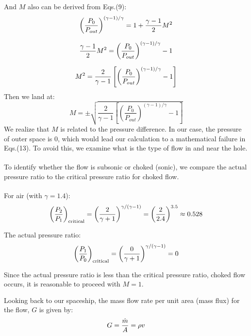 And $M$ also can be derived from Eqs.(9):
\begin{equation}
\left( \frac{P_0}{P_{out}} \right)^{(\gamma - 1)/\gamma} = 1 + \frac{\gamma - 1}{2} M^2\notag
\end{equation}

\begin{equation}
\frac{\gamma - 1}{2} M^2= \left( \frac{P_0}{P_{out}} \right)^{(\gamma - 1)/\gamma} - 1 \notag
\end{equation}

\begin{equation}
M^2 = \frac{2}{\gamma - 1} \left[ \left( \frac{P_0}{P_{out}} \right)^{(\gamma - 1)/\gamma} - 1 \right]\notag
\end{equation}
Then we land at:
\begin{equation}
    M=\pm \sqrt{\frac{2}{\gamma - 1} \left[ \left( \frac{P_0}{P_{out}} \right)^{(\gamma - 1)/\gamma} - 1 \right]}
\end{equation}
We realize that $M$ is related to the pressure difference. In our case, the pressure of outer space is 0, which would lead our calculation to a mathematical failure in Eqs.(13). To avoid this, we examine what is the type of flow in and near the hole. \\\\
To identify whether the flow is subsonic or choked (sonic), we compare the actual pressure ratio to the critical pressure ratio for choked flow.
\\\\
For air (with $\gamma = 1.4$):
\begin{equation}\notag
\left( \frac{P_2}{P_1} \right)_{\text{critical}} = \left( \frac{2}{\gamma + 1} \right)^{\gamma/(\gamma - 1)} = \left( \frac{2}{2.4} \right)^{3.5} \approx 0.528
\end{equation}

The actual pressure ratio:
\begin{equation}\notag
\left( \frac{P_1}{P_0} \right)_{\text{critical}} = \left( \frac{0}{\gamma + 1} \right)^{\gamma/(\gamma - 1)}  =0
\end{equation}

Since the actual pressure ratio is less than the critical pressure ratio, choked flow occurs, it is reasonable to proceed with $M=1$.\cite{saad-1985}

\vspace{\baselineskip} 
Looking back to our spaceship, the mass flow rate per unit area (mass flux) for the flow, $G$ is given by:
\begin{equation}\notag
    G=\frac{\dot{m}}{A}=\rho v
\end{equation}

